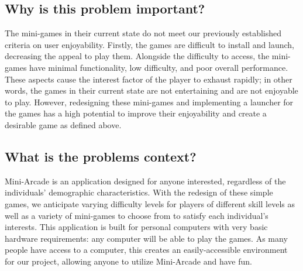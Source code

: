 \documentclass{article}
\begin{document}
\subsection{Why is this problem important?}
The mini-games in their current state do not meet our previously established criteria on user enjoyability. Firstly, the games are difficult to install and launch, decreasing the appeal to play them. Alongside the difficulty to access, the mini-games have minimal functionality, low difficulty, and poor overall performance. These aspects cause the interest factor of the player to exhaust rapidly; in other words, the games in their current state are not entertaining and are not enjoyable to play. However, redesigning these mini-games and implementing a launcher for the games has a high potential to improve their enjoyability and create a desirable game as defined above.

\subsection{What is the problems context?}
Mini-Arcade is an application designed for anyone interested, regardless of the individuals' demographic characteristics. With the redesign of these simple games, we anticipate varying difficulty levels for players of different skill levels as well as a variety of mini-games to choose from to satisfy each individual's interests. This application is built for personal computers with very basic hardware requirements: any computer will be able to play the games. As many people have access to a computer, this creates an easily-accessible environment for our project, allowing anyone to utilize Mini-Arcade and have fun.

	





\end{document}
